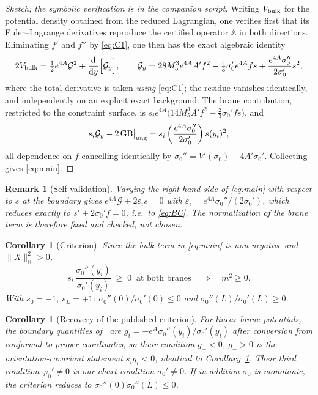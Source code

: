 \documentclass[11pt,a4paper]{article}
\newtheorem{corollary}[theorem]{Corollary}
\newtheorem{remark}[theorem]{Remark}
\newcommand{\Gcal}{\mathcal{G}}
\newcommand{\dd}{\mathrm{d}}
\newcommand{\sig}{\sigma_0}
\begin{document}
\begin{proof}[Sketch; the symbolic verification is in the companion script]
Writing $V_{\rm bulk}$ for the potential density obtained from the
reduced Lagrangian, one verifies first that its Euler--Lagrange
derivatives reproduce the certified operator $\mathbb{A}$ in both
directions. Eliminating $f'$ and $f''$ by \eqref{eq:C1}, one then has
the exact algebraic identity
\begin{equation}
2V_{\rm bulk}=\tfrac12 e^{4A}\Gcal^2+\frac{\dd}{\dd y}\Big[\Gcal_y\Big],
\qquad
\Gcal_y=28M_5^3e^{4A}A'f^2-\tfrac43\sig'e^{4A}fs
+\frac{e^{4A}\sig''}{2\sig'}s^2,
\label{eq:tot}
\end{equation}
where the total derivative is taken \emph{using} \eqref{eq:C1}; the
residue vanishes identically, and independently on an explicit exact
background. The brane contribution, restricted to the constraint
surface, is $s_ie^{4A}\big(14M_5^3A'f^2-\tfrac23\sig'fs\big)$, and
\begin{equation}
s_i\Gcal_y-2\,\mathrm{GB}\big|_{\rm img}
=s_i\left(\frac{e^{4A}\sig''}{2\sig'}\right)s(y_i)^2,
\end{equation}
all dependence on $f$ cancelling identically by
$\sig''=V'(\sig)-4A'\sig'$. Collecting gives \eqref{eq:main}.
\end{proof}

\begin{remark}[Self-validation]
Varying the right-hand side of \eqref{eq:main} with respect to $s$ at
the boundary gives $e^{4A}\Gcal+2\varepsilon_is=0$ with
$\varepsilon_i=e^{4A}\sig''/(2\sig')$, which reduces \emph{exactly} to
$s'+2\sig'f=0$, i.e.\ to \eqref{eq:BC}. The normalization of the brane
term is therefore fixed and checked, not chosen.
\end{remark}

\begin{corollary}[Criterion]
\label{cor:crit}
Since the bulk term in \eqref{eq:main} is non-negative and
$\|X\|^2_{\mathbb{K}}>0$,
\begin{equation}
\boxed{\;s_i\,\frac{\sig''(y_i)}{\sig'(y_i)}\;\ge\;0
\ \text{ at both branes}\quad\Longrightarrow\quad m^2\ge0 .\;}
\end{equation}
With $s_0=-1$, $s_L=+1$: $\sig''(0)/\sig'(0)\le0$ and
$\sig''(L)/\sig'(L)\ge0$.
\end{corollary}

\begin{corollary}[Recovery of the published criterion]
For linear brane potentials, the boundary quantities of~\cite{LS} are
$g_i=-e^{A}\sig''(y_i)/\sig'(y_i)$ after conversion from conformal to
proper coordinates, so their condition $g_+<0$, $g_->0$ is the
orientation-covariant statement $s_ig_i<0$, identical to
Corollary~\ref{cor:crit}. Their third condition $\varphi_0'\neq0$ is
our chart condition $\sig'\neq0$. If in addition $\sig$ is monotonic,
the criterion reduces to $\sig''(0)\sig''(L)\le0$.
\end{corollary}
\end{document}
